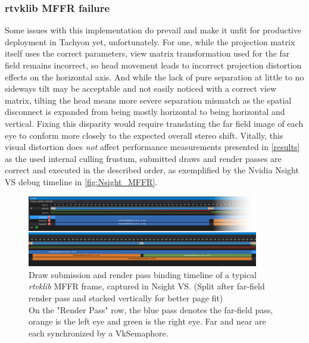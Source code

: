 \subsubsection{rtvklib MFFR failure}
Some issues with this implementation do prevail and make it unfit for productive deployment in Tachyon yet, unfortunately. 
For one, while the projection matrix itself uses the correct parameters, view matrix transformation used for the far field remains incorrect, so head movement leads to incorrect projection distortion effects on the horizontal axis. And while the lack of pure separation at little to no sideways tilt may be acceptable and not easily noticed with a correct view matrix, tilting the head means more severe separation mismatch as the spatial disconnect is expanded from being mostly horizontal to being horizontal and vertical. Fixing this disparity would require translating the far field image of each eye to conform more closely to the expected overall stereo shift. 
Vitally, this visual distortion does \textit{not} affect performance measurements presented in \autoref{results} as the used internal culling frustum, submitted draws and render passes are correct and executed in the described order, as exemplified by the Nvidia Nsight VS debug timeline in \autoref{fig:Nsight_MFFR}. \\

\begin{figure}[htb]
  \centering
  \includegraphics[width=0.9\textwidth]{pictures/mffr_timeline_stacked_delimited}
  \caption{Draw submission and render pass binding timeline of a typical \textit{rtvklib} MFFR frame, captured in Nsight VS. (Split after far-field render pass and stacked vertically for better page fit) \\On the "Render Pass" row, the blue pass denotes the far-field pass, orange is the left eye and green is the right eye. Far and near are each synchronized by a VkSemaphore.} \label{fig:Nsight_MFFR}
\end{figure}

